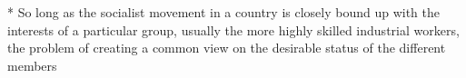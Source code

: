 \documentclass[11pt,openany]{book}
\begin{document}
\begin{center}\textasteriskcentered\hspace{0.9em}\textasteriskcentered\hspace{0.9em}\textasteriskcentered\end{center}

\begin{center}\textasteriskcentered\hspace{0.9em}\textasteriskcentered\hspace{0.9em}\textasteriskcentered\end{center}

\begin{center}\textasteriskcentered\hspace{0.9em}\textasteriskcentered\hspace{0.9em}\textasteriskcentered\end{center}

\begin{center}\textasteriskcentered\hspace{0.9em}\textasteriskcentered\hspace{0.9em}\textasteriskcentered\end{center}

* So long as the socialist movement in a country is closely bound up with the interests of a particular group, usually the more highly skilled industrial workers, the problem of creating a common view on the desirable status of the different members
\end{document}
